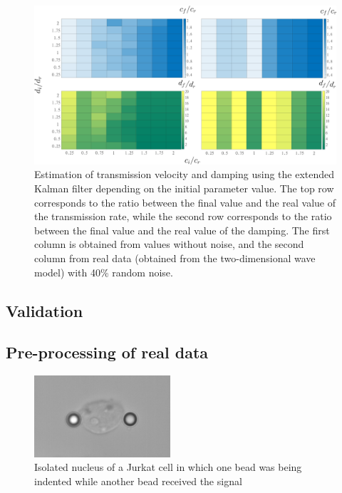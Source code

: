 \documentclass[12pt, a4paper]{article} %
\begin{document}
\begin{figure}[h!]
    \centering
    \includegraphics[width=1\textwidth]{figures/dependencia_valores_iniciales_1.png}
    \caption{Estimation of  transmission velocity and damping using the extended Kalman filter depending on the initial parameter value. The top row corresponds to the ratio between the final value and the real value of the transmission rate, while the second row corresponds to the ratio between the final value and the real value of the damping. The first column is obtained from values without noise, and the second column from real data (obtained from the two-dimensional wave model) with 40\% random noise.}
    \label{fig:valorescd}
\end{figure}

\newpage

\setlength{\parskip}{0mm}

\subsection{Validation}

\subsection{Pre-processing of real data}

\begin{figure}
    \centering
    \includegraphics[width=0.45\textwidth]{figures/recorte_nucleo.png}
    \caption{Isolated nucleus of a Jurkat cell in which one bead was being indented while another bead received the signal}
    \label{fig:myfig3}
\end{figure}
\end{document}
